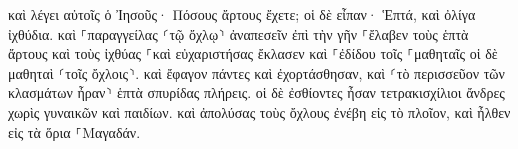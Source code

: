 \documentclass{openreader}
\begin{document}
καὶ λέγει αὐτοῖς ὁ Ἰησοῦς· Πόσους ἄρτους ἔχετε; οἱ δὲ εἶπαν· Ἑπτά, καὶ ὀλίγα ἰχθύδια. 
καὶ ⸀παραγγείλας ⸂τῷ ὄχλῳ⸃ ἀναπεσεῖν ἐπὶ τὴν γῆν 
⸀ἔλαβεν τοὺς ἑπτὰ ἄρτους καὶ τοὺς ἰχθύας ⸀καὶ εὐχαριστήσας ἔκλασεν καὶ ⸀ἐδίδου τοῖς ⸀μαθηταῖς οἱ δὲ μαθηταὶ ⸂τοῖς ὄχλοις⸃. 
καὶ ἔφαγον πάντες καὶ ἐχορτάσθησαν, καὶ ⸂τὸ περισσεῦον τῶν κλασμάτων ἦραν⸃ ἑπτὰ σπυρίδας πλήρεις. 
οἱ δὲ ἐσθίοντες ἦσαν τετρακισχίλιοι ἄνδρες χωρὶς γυναικῶν καὶ παιδίων. 
καὶ ἀπολύσας τοὺς ὄχλους ἐνέβη εἰς τὸ πλοῖον, καὶ ἦλθεν εἰς τὰ ὅρια ⸀Μαγαδάν. 
\end{document}

